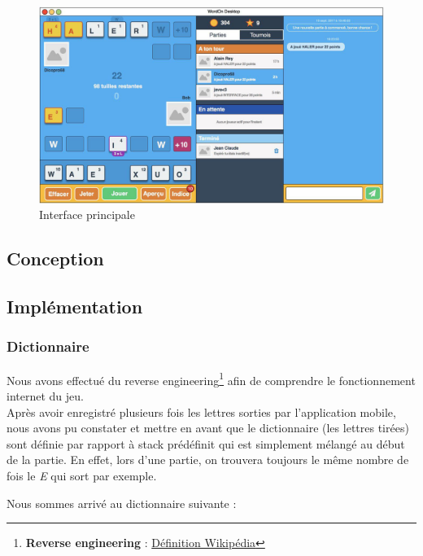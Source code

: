 \documentclass[a4paper,12pt]{article}
\begin{document}
		\begin{figure}[h]
			\centering
			\includegraphics[width=0.6\linewidth]{img/main.jpg}
			\caption{Interface principale}
		\end{figure}
		
	\subsection{Conception}
	
	\subsection{Implémentation}
		\subsubsection{Dictionnaire}
		Nous avons effectué du reverse engineering\footnote{\textbf{Reverse engineering} :  \href{https://fr.wikipedia.org/wiki/R\%C3\%A9tro-ing\%C3\%A9nierie}{Définition Wikipédia}} afin de comprendre le fonctionnement internet du jeu.\\
		Après avoir enregistré plusieurs fois les lettres sorties par l'application mobile, nous avons pu constater et mettre en avant que le dictionnaire (les lettres tirées) sont définie par rapport à stack prédéfinit qui est simplement mélangé au début de la partie. En effet, lors d'une partie, on trouvera toujours le même nombre de fois le \textit{E} qui sort par exemple.
		
		Nous sommes arrivé au dictionnaire suivante : 
		
\end{document}
